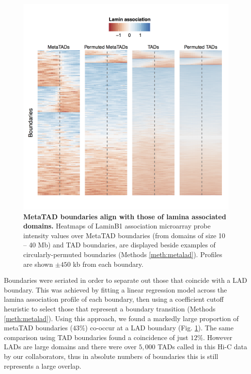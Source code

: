 \documentclass[a4paper,11pt,oneside]{book}
\begin{document}
\begin{figure}
\begin{center} 
\includegraphics[width=4.5in]{mt_laminperm.png}
\captionsetup{width=\textwidth}
\caption[MetaTAD boundaries align with those of lamina associated domains.]{ {\bf MetaTAD boundaries align with those of lamina associated domains.}
Heatmaps of LaminB1 association microarray probe intensity values over MetaTAD boundaries (from domains of size 10 -- 40 Mb) and TAD boundaries, are displayed beside examples of circularly-permuted boundaries (Methods \ref{meth:metalad}). Profiles are shown $\pm450$ kb from each boundary.
}\label{fig:mtlamin}
\end{center}
\end{figure} 

Boundaries were seriated in order to separate out those that coincide with a LAD boundary. This was achieved by fitting a linear regression model across the lamina association profile of each boundary, then using a coefficient cutoff heuristic to select those that represent a boundary transition (Methods \ref{meth:metalad}).  Using this approach, we found a markedly large proportion of metaTAD boundaries ($43\%$) co-occur at a LAD boundary (Fig. \ref{fig:mtlamin}). The same comparison using TAD boundaries found a coincidence of just $12\%$. However LADs are large domains and there were over $5,000$ TADs called in this Hi-C data by our collaborators, thus in absolute numbers of boundaries this is still represents a large overlap.
\end{document}

